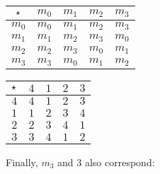 \documentclass[../../../main.tex]{subfiles}
\begin{document}
\begin{center}
  \begin{tabular}{| c || c | c | c | c |}
    \hline
    $\opSymbol/$ & $m_{0}$ & $m_{1}$ & \cellcolor{grey3} $m_{2}$ & $m_{3}$ \\ \hline \hline
    $m_{0}$      & $m_{0}$ & $m_{1}$ & \cellcolor{grey3} $m_{2}$ & $m_{3}$ \\ \hline
    $m_{1}$      & $m_{1}$ & \cellcolor{grey3} $m_{2}$ & $m_{3}$ & $m_{0}$ \\ \hline
    \cellcolor{grey3} $m_{2}$      & \cellcolor{grey3} $m_{2}$ & $m_{3}$ & $m_{0}$ & $m_{1}$ \\ \hline
    $m_{3}$      & $m_{3}$ & $m_{0}$ & $m_{1}$ & \cellcolor{grey3} $m_{2}$ \\ \hline
  \end{tabular}
  \hskip 2cm
  \begin{tabular}{| c || c | c | c | c |}
    \hline
    $\opSymbol/$ & $4$ & $1$ & \cellcolor{grey3} $2$ & $3$ \\ \hline \hline
    $4$          & $4$ & $1$ & \cellcolor{grey3} $2$ & $3$ \\ \hline
    $1$          & $1$ & \cellcolor{grey3} $2$ & $3$ & $4$ \\ \hline
    \cellcolor{grey3} $2$          & \cellcolor{grey3} $2$ & $3$ & $4$ & $1$ \\ \hline
    $3$          & $3$ & $4$ & $1$ & \cellcolor{grey3} $2$ \\ \hline
  \end{tabular}
\end{center}

Finally, $m_{3}$ and $3$ also correspond:
\end{document}
